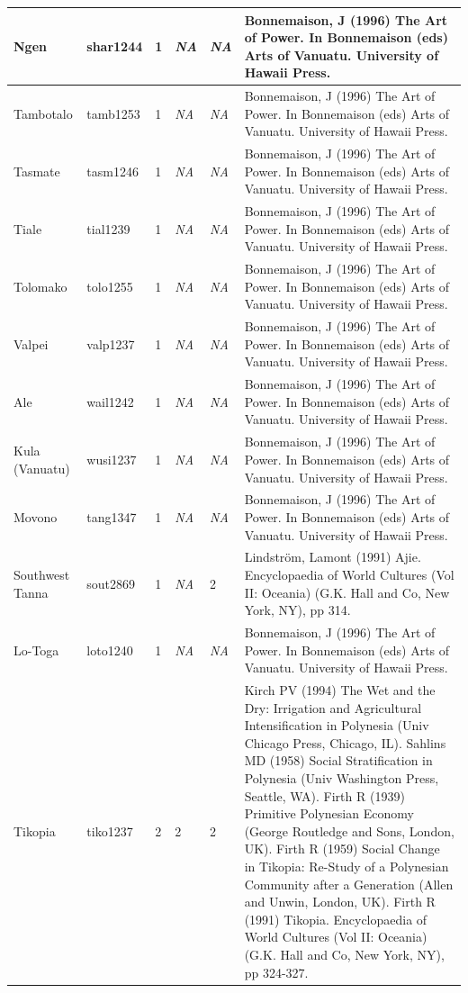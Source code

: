 \documentclass[a4paper,10pt]{article} %
\begin{document}
\begin{landscape}
\begin{longtable}{ | p{2cm}| p{2cm}| p{1.8cm}| p{1.8cm}| p{3cm}| p{9cm}| }
Ngen&shar1244&1&\emph{NA}&\emph{NA}&Bonnemaison, J (1996) The Art of Power. In Bonnemaison (eds) Arts of Vanuatu. University of Hawaii Press.\\ \hline
Tambotalo&tamb1253&1&\emph{NA}&\emph{NA}&Bonnemaison, J (1996) The Art of Power. In Bonnemaison (eds) Arts of Vanuatu. University of Hawaii Press.\\ \hline
Tasmate&tasm1246&1&\emph{NA}&\emph{NA}&Bonnemaison, J (1996) The Art of Power. In Bonnemaison (eds) Arts of Vanuatu. University of Hawaii Press.\\ \hline
Tiale&tial1239&1&\emph{NA}&\emph{NA}&Bonnemaison, J (1996) The Art of Power. In Bonnemaison (eds) Arts of Vanuatu. University of Hawaii Press.\\ \hline
Tolomako&tolo1255&1&\emph{NA}&\emph{NA}&Bonnemaison, J (1996) The Art of Power. In Bonnemaison (eds) Arts of Vanuatu. University of Hawaii Press.\\ \hline
Valpei&valp1237&1&\emph{NA}&\emph{NA}&Bonnemaison, J (1996) The Art of Power. In Bonnemaison (eds) Arts of Vanuatu. University of Hawaii Press.\\ \hline
Ale&wail1242&1&\emph{NA}&\emph{NA}&Bonnemaison, J (1996) The Art of Power. In Bonnemaison (eds) Arts of Vanuatu. University of Hawaii Press.\\ \hline
Kula (Vanuatu)&wusi1237&1&\emph{NA}&\emph{NA}&Bonnemaison, J (1996) The Art of Power. In Bonnemaison (eds) Arts of Vanuatu. University of Hawaii Press.\\ \hline
Movono&tang1347&1&\emph{NA}&\emph{NA}&Bonnemaison, J (1996) The Art of Power. In Bonnemaison (eds) Arts of Vanuatu. University of Hawaii Press.\\ \hline
Southwest Tanna&sout2869&1&\emph{NA}&2&Lindström, Lamont (1991) Ajie. Encyclopaedia of World Cultures (Vol II: Oceania) (G.K. Hall and Co, New York, NY), pp 314.\\ \hline
Lo-Toga&loto1240&1&\emph{NA}&\emph{NA}&Bonnemaison, J (1996) The Art of Power. In Bonnemaison (eds) Arts of Vanuatu. University of Hawaii Press.\\ \hline
Tikopia&tiko1237&2&2&2&Kirch PV (1994) The Wet and the Dry: Irrigation and Agricultural Intensification in Polynesia (Univ Chicago Press, Chicago, IL). Sahlins MD (1958) Social Stratification in Polynesia (Univ Washington Press, Seattle, WA). Firth R (1939) Primitive Polynesian Economy (George Routledge and Sons, London, UK). Firth R (1959) Social Change in Tikopia: Re-Study of a Polynesian Community after a Generation (Allen and Unwin, London, UK). Firth R (1991) Tikopia. Encyclopaedia of World Cultures (Vol II: Oceania) (G.K. Hall and Co, New York, NY), pp 324-327. \\ \hline

\end{longtable}
\end{landscape}
\end{document}
